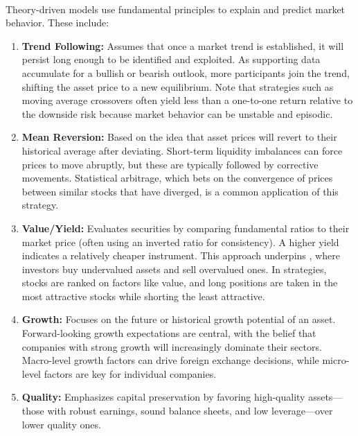 \begin{definition} \\
Theory-driven models use fundamental principles to explain and predict market behavior. These include:
\begin{enumerate}[label=\roman*.]
  \setlength{\itemsep}{0pt}
  \item \textbf{Trend Following:}  
  Assumes that once a market trend is established, it will persist long enough to be identified and exploited. As supporting data accumulate for a bullish or bearish outlook, more participants join the trend, shifting the asset price to a new equilibrium. Note that strategies such as moving average crossovers often yield less than a one-to-one return relative to the downside risk because market behavior can be unstable and episodic.

  \item \textbf{Mean Reversion:}  
  Based on the idea that asset prices will revert to their historical average after deviating. Short-term liquidity imbalances can force prices to move abruptly, but these are typically followed by corrective movements. Statistical arbitrage, which bets on the convergence of prices between similar stocks that have diverged, is a common application of this strategy.

  \item \textbf{Value/Yield:}  
  Evaluates securities by comparing fundamental ratios to their market price (often using an inverted ratio for consistency). A higher yield indicates a relatively cheaper instrument. This approach underpins , where investors buy undervalued assets and sell overvalued ones. In  strategies, stocks are ranked on factors like value, and long positions are taken in the most attractive stocks while shorting the least attractive.

  \item \textbf{Growth:}  
  Focuses on the future or historical growth potential of an asset. Forward-looking growth expectations are central, with the belief that companies with strong growth will increasingly dominate their sectors. Macro-level growth factors can drive foreign exchange decisions, while micro-level factors are key for individual companies.

  \item \textbf{Quality:}  
  Emphasizes capital preservation by favoring high-quality assets—those with robust earnings, sound balance sheets, and low leverage—over lower quality ones.
\end{enumerate}
\end{definition}


